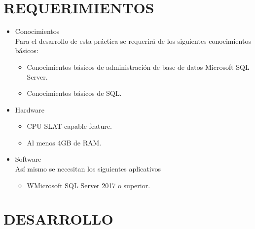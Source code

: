 \documentclass[12pt,letterpaper]{article}
\begin{document}
    \section{REQUERIMIENTOS}
    \begin{itemize}
        \item Conocimientos\\
        Para el desarrollo de esta práctica se requerirá de los siguientes conocimientos básicos:
        \begin{itemize} 
            \item Conocimientos básicos de administración de base de datos Microsoft SQL Server.
            \item Conocimientos básicos de SQL.
        \end{itemize}
        \item Hardware
        \begin{itemize}
            \item CPU SLAT-capable feature.
            \item Al menos 4GB de RAM.
        \end{itemize}
        \item Software\\
        Así mismo se necesitan los siguientes aplicativos
        \begin{itemize}
            \item WMicrosoft SQL Server 2017 o superior.
        \end{itemize}
    \end{itemize}
    \newpage
    \section{DESARROLLO}
\end{document}
